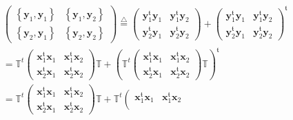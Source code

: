 \documentclass[aps, preprint]{revtex4}
\begin{document}
\begin{align} & \left (\begin{array}{cc}\left \{\mathbf{y}_{1} ,\mathbf{y}_{1}\right \} & \left \{\mathbf{y}_{1} ,\mathbf{y}_{2}\right \} \\
\left \{\mathbf{y}_{2} ,\mathbf{y}_{1}\right \} & \left \{\mathbf{y}_{2} ,\mathbf{y}_{2}\right \}\end{array}\right )\overset{\triangle }{ =}\left (\begin{array}{cc}\mathbf{y}_{1}^{\mathfrak{t}} \mathbf{y}_{1} & \mathbf{y}_{1}^{\mathfrak{t}} \mathbf{y}_{2} \\
\mathbf{y}_{2}^{\mathfrak{t}} \mathbf{y}_{1} & \mathbf{y}_{2}^{\mathfrak{t}} \mathbf{y}_{2}\end{array}\right ) +\left (\begin{array}{cc}\mathbf{y}_{1}^{\mathfrak{t}} \mathbf{y}_{1} & \mathbf{y}_{1}^{\mathfrak{t}} \mathbf{y}_{2} \\
\mathbf{y}_{2}^{\mathfrak{t}} \mathbf{y}_{1} & \mathbf{y}_{2}^{\mathfrak{t}} \mathbf{y}_{2}\end{array}\right )^{\mathfrak{t}} \nonumber  \\
 &  =\mathbb{T}^{t} \left (\begin{array}{cc}\mathbf{x}_{1}^{\mathfrak{t}} \mathbf{x}_{1} & \mathbf{x}_{1}^{\mathfrak{t}} \mathbf{x}_{2} \\
\mathbf{x}_{2}^{\mathfrak{t}} \mathbf{x}_{1} & \mathbf{x}_{2}^{\mathfrak{t}} \mathbf{x}_{2}\end{array}\right ) \mathbb{T} +\left (\mathbb{T}^{t} \left (\begin{array}{cc}\mathbf{x}_{1}^{\mathfrak{t}} \mathbf{x}_{1} & \mathbf{x}_{1}^{\mathfrak{t}} \mathbf{x}_{2} \\
\mathbf{x}_{2}^{\mathfrak{t}} \mathbf{x}_{1} & \mathbf{x}_{2}^{\mathfrak{t}} \mathbf{x}_{2}\end{array}\right ) \mathbb{T}\right )^{\mathfrak{t}} \\
 &  =\mathbb{T}^{t} \left (\begin{array}{cc}\mathbf{x}_{1}^{\mathfrak{t}} \mathbf{x}_{1} & \mathbf{x}_{1}^{\mathfrak{t}} \mathbf{x}_{2} \\
\mathbf{x}_{2}^{\mathfrak{t}} \mathbf{x}_{1} & \mathbf{x}_{2}^{\mathfrak{t}} \mathbf{x}_{2}\end{array}\right ) \mathbb{T} +\mathbb{T}^{t} \left (\begin{array}{cc}\mathbf{x}_{1}^{\mathfrak{t}} \mathbf{x}_{1} & \mathbf{x}_{1}^{\mathfrak{t}} \mathbf{x}_{2} \\

\end{array}
\end{align}
\end{document}
